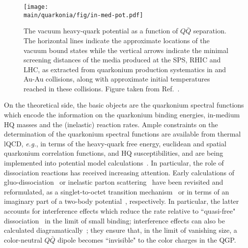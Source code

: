 \documentclass[../report.tex]{subfiles}
\providecommand{\main}{..}
\begin{document}
\begin{figure}[!h]
\begin{center}
\texttt{[image: \\main/quarkonia/fig/in-med-pot.pdf]}
\end{center}
\vspace{-0.5cm}
\caption{The vacuum heavy-quark potential as a function of $Q\bar Q$ separation. The horizontal lines indicate the approximate locations of the vacuum bound states while the vertical arrows indicate the minimal screening distances of the media produced at the SPS, RHIC and LHC, as extracted from quarkonium production systematics in \PbPb and Au-Au collisions, along with approximate initial temperatures reached in these collisions. Figure taken from Ref.~\cite{Rapp:2017chc}.}
\label{FigQ:pot}
\end{figure}

On the theoretical side, the basic objects are the quarkonium spectral functions which encode the information on the quarkonium binding energies, in-medium HQ masses and the (inelastic) reaction rates.  Ample constraints on the determination of the quarkonium spectral functions are available from thermal lQCD, {\it e.g.}, in terms of the heavy-quark free energy, euclidean and spatial quarkonium correlation functions, and HQ susceptibilities, and are being implemented into potential model calculations~\cite{Wong:2004zr,Mocsy:2005qw,Alberico:2006vw,Brambilla:2008cx,Riek:2010py,Burnier:2015tda,Liu:2017qah}.
In particular, the role of dissociation reactions has received increasing attention. Early calculations of gluo-dissociation~\cite{Bhanot:1979vb,Kharzeev:1994pz} or inelastic parton scattering~\cite{Grandchamp:2001pf} have been revisited and reformulated, \eg as a singlet-to-octet transition mechanism~\cite{Brambilla:2008cx} or in terms of an imaginary part of a two-body potential~\cite{Laine:2006ns}, respectively. In particular, the latter accounts for interference effects which reduce the rate relative to ``quasi-free" dissociation~\cite{Grandchamp:2001pf} in the limit of small binding; interference effects can also be calculated diagramatically~\cite{Park:2007zza}; they ensure that, in the limit of vanishing size, a color-neutral $Q\bar Q$ dipole becomes ``invisible" to the color charges in the QGP.
\end{document}
